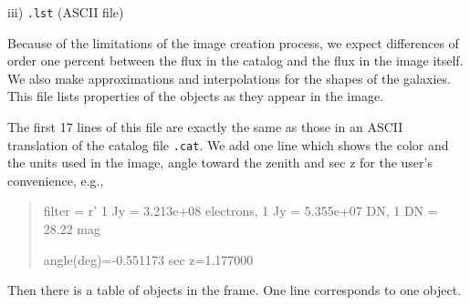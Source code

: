 \noindent
iii) {\tt *.lst} (ASCII file)

Because of the limitations of the image creation process, we expect 
differences of order one percent
between the flux in the catalog and the flux in the image itself.
We also make approximations and interpolations for the shapes of the galaxies.
This file lists properties of the objects as they appear in the image.

The first 17 lines of this file are exactly the same as those in 
an ASCII translation of the catalog file {\tt *.cat}.
We add one line which shows the color and the units used in the image,
angle toward the zenith and sec z for the user's convenience,
e.g., 

\begin{quote}
filter = r'  1 Jy =  3.213e+08 electrons, 1 Jy =  5.355e+07 DN, 1 DN =    28.22 mag           

angle(deg)=-0.551173   sec z=1.177000

\end{quote}

\noindent
Then there is a table of objects in the frame.
One line corresponds to one object. 

